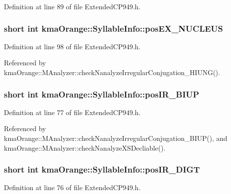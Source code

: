 Definition at line 89 of file ExtendedCP949.h.\hypertarget{structkmaOrange_1_1SyllableInfo_c4b430cdad3891bb8f7d6950d9f3a4f6}{
\subsubsection[{posEX\_\-NUCLEUS}]{\setlength{\rightskip}{0pt plus 5cm}short int {\bf kmaOrange::SyllableInfo::posEX\_\-NUCLEUS}}}
\label{structkmaOrange_1_1SyllableInfo_c4b430cdad3891bb8f7d6950d9f3a4f6}




Definition at line 98 of file ExtendedCP949.h.

Referenced by kmaOrange::MAnalyzer::checkNanalyzeIrregularConjugation\_\-HIUNG().\hypertarget{structkmaOrange_1_1SyllableInfo_edc0b4e09fca243443b18ca05ddedc03}{
\subsubsection[{posIR\_\-BIUP}]{\setlength{\rightskip}{0pt plus 5cm}short int {\bf kmaOrange::SyllableInfo::posIR\_\-BIUP}}}
\label{structkmaOrange_1_1SyllableInfo_edc0b4e09fca243443b18ca05ddedc03}




Definition at line 77 of file ExtendedCP949.h.

Referenced by kmaOrange::MAnalyzer::checkNanalyzeIrregularConjugation\_\-BIUP(), and kmaOrange::MAnalyzer::checkNanalyzeXSDecliable().\hypertarget{structkmaOrange_1_1SyllableInfo_d05b566017dcb1834959282fddbd1a17}{
\subsubsection[{posIR\_\-DIGT}]{\setlength{\rightskip}{0pt plus 5cm}short int {\bf kmaOrange::SyllableInfo::posIR\_\-DIGT}}}
\label{structkmaOrange_1_1SyllableInfo_d05b566017dcb1834959282fddbd1a17}




Definition at line 76 of file ExtendedCP949.h.

